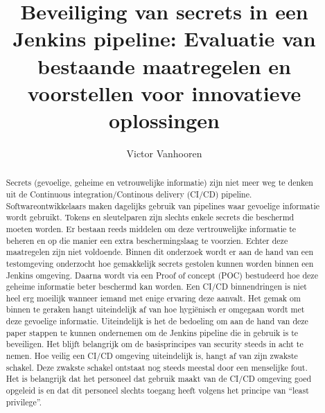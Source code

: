 \documentclass{hogent-article}
\title{Beveiliging van secrets in een Jenkins pipeline: Evaluatie van bestaande maatregelen en voorstellen voor innovatieve oplossingen 
}
\author{Victor Vanhooren}
\begin{document}
\begin{abstract}
  Secrets (gevoelige, geheime en vetrouwelijke informatie) zijn niet meer weg te denken uit de Continuous integration/Continous delivery (CI/CD) pipeline. Softwareontwikkelaars maken dagelijks gebruik van pipelines waar gevoelige informatie wordt gebruikt. Tokens en sleutelparen zijn slechts enkele secrets die beschermd moeten worden. Er bestaan reeds middelen om deze vertrouwelijke informatie te beheren en op die manier een extra beschermingslaag te voorzien. Echter deze maatregelen zijn niet voldoende. Binnen dit onderzoek wordt er aan de hand van een testomgeving onderzocht hoe gemakkelijk secrets gestolen kunnen worden binnen een Jenkins omgeving. Daarna wordt via een Proof of concept (POC) bestudeerd hoe deze geheime informatie beter beschermd kan worden. Een CI/CD binnendringen is niet heel erg moeilijk wanneer iemand met enige ervaring deze aanvalt. Het gemak om binnen te geraken hangt uiteindelijk af van hoe hygiënisch er omgegaan wordt met deze gevoelige informatie. Uiteindelijk is het de bedoeling om aan de hand van deze paper stappen te kunnen ondernemen om de Jenkins pipeline die in gebruik is te beveiligen. Het blijft belangrijk om de basisprincipes van security steeds in acht te nemen. Hoe veilig een CI/CD omgeving uiteindelijk is, hangt af van zijn zwakste schakel. Deze zwakste schakel ontstaat nog steeds meestal door een menselijke fout. Het is belangrijk dat het personeel dat gebruik maakt van de CI/CD omgeving goed opgeleid is en dat dit personeel slechts toegang heeft volgens het principe van “least privilege”.
\end{abstract}

\tableofcontents



\printbibliography[heading=bibintoc]
\end{document}
